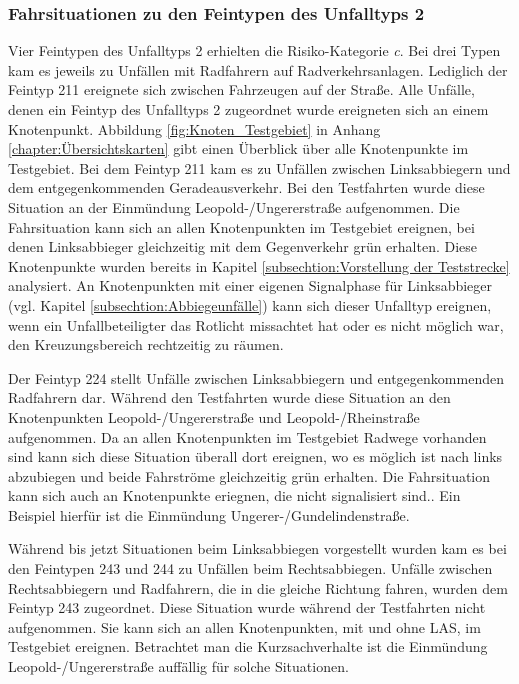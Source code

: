 \subsubsection{Fahrsituationen zu den Feintypen des Unfalltyps 2}
Vier Feintypen des Unfalltyps 2 erhielten die Risiko-Kategorie \textit{c}. Bei drei Typen kam es jeweils zu Unfällen mit Radfahrern auf Radverkehrsanlagen. Lediglich der Feintyp 211 ereignete sich zwischen Fahrzeugen auf der Straße. Alle Unfälle, denen ein Feintyp des Unfalltyps 2 zugeordnet wurde ereigneten sich an einem Knotenpunkt. Abbildung \ref{fig:Knoten_Testgebiet} in Anhang \ref{chapter:Übersichtskarten} gibt einen Überblick über alle Knotenpunkte im Testgebiet. Bei dem Feintyp 211  kam es zu Unfällen zwischen Linksabbiegern und dem entgegenkommenden Geradeausverkehr. Bei den Testfahrten wurde diese Situation an der Einmündung Leopold-/Ungererstraße aufgenommen. Die Fahrsituation kann sich an allen Knotenpunkten im Testgebiet ereignen, bei denen Linksabbieger gleichzeitig mit dem Gegenverkehr grün erhalten. Diese Knotenpunkte wurden bereits in Kapitel \ref{subsechtion:Vorstellung der Teststrecke} analysiert. An Knotenpunkten mit einer eigenen Signalphase für Linksabbieger (vgl. Kapitel \ref{subsechtion:Abbiegeunfälle}) kann sich dieser Unfalltyp ereignen, wenn ein Unfallbeteiligter das Rotlicht missachtet hat oder es nicht möglich war, den Kreuzungsbereich rechtzeitig zu räumen.

Der Feintyp 224 stellt Unfälle zwischen Linksabbiegern und entgegenkommenden Radfahrern dar. Während den Testfahrten wurde diese Situation an den Knotenpunkten Leopold-/Ungererstraße und Leopold-/Rheinstraße aufgenommen. Da an allen Knotenpunkten im Testgebiet Radwege vorhanden sind kann sich diese Situation überall dort ereignen, wo es möglich ist nach links abzubiegen und beide Fahrströme gleichzeitig grün erhalten. Die Fahrsituation kann sich auch an Knotenpunkte eriegnen, die nicht signalisiert sind.. Ein Beispiel hierfür ist die Einmündung Ungerer-/Gundelindenstraße.

Während bis jetzt Situationen beim Linksabbiegen vorgestellt wurden kam es bei den Feintypen 243 und 244 zu Unfällen beim Rechtsabbiegen. Unfälle zwischen Rechtsabbiegern und Radfahrern, die in die gleiche Richtung fahren, wurden dem Feintyp 243 zugeordnet. Diese Situation wurde während der Testfahrten nicht aufgenommen. Sie kann sich an allen Knotenpunkten, mit und ohne LAS, im Testgebiet ereignen. Betrachtet man die Kurzsachverhalte ist die Einmündung Leopold-/Ungererstraße auffällig für solche Situationen.

